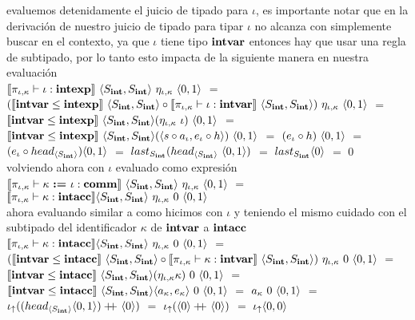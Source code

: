 evaluemos detenidamente el juicio de tipado para $\iota$, es importante notar que en
la derivaci\'on de nuestro juicio de tipado  para tipar $\iota$ no alcanza con
simplemente buscar en el contexto, ya que $\iota$ tiene tipo $\textbf{intvar}$ entonces
hay que usar una regla de subtipado, por lo tanto esto impacta de la siguiente
manera en nuestra evaluaci\'on\\

$\llbracket  \pi_{\iota,\kappa} \vdash \iota : \textbf{intexp}  \rrbracket 
	\ \langle S_{\textbf{int}},S_{\textbf{int}} \rangle
	\ \eta_{\iota,\kappa} 
	\ \langle 0,1 \rangle$ $=$ \\
	\indent
	$(\semBrcks{\intvar \leq \intexp} \ \lrangles{S_\intt,S_\intt}
	\circ 
	\semBrcks{ \pi_{\iota,\kappa} \vdash \iota : \intvar } \ \lrangles{S_\intt,S_\intt})
		\ \eta_{\iota,\kappa} 
		\ \lrangles{0,1}$ $=$\\
	\indent
	$\semBrcks{\intvar \leq \intexp} \ \lrangles{S_\intt,S_\intt} 
				(\eta_{\iota,\kappa} \ \iota) \ \lrangles{0,1}$ $=$\\
	\indent
	$\semBrcks{\intvar \leq \intexp} \ \lrangles{S_\intt,S_\intt} 
				(\lrangles{s \circ a_\iota,e_\iota \circ h}) \ \lrangles{0,1}$ $=$
	$(e_\iota \circ h) \ \langle 0,1 \rangle$ $=$\\
	\indent
	$(e_\iota \circ head_{\langle S_{\textbf{int}} \rangle}) \langle 0,1 \rangle$ $=$
	$last_{S_\intt} (head_{\lrangles{S_\intt}} \ \lrangles{0,1})$ $=$
	$last_{S_{\textbf{int}}} \langle 0 \rangle$ $=$ $0$\\
	
volviendo ahora con $\iota$ evaluado como expresi\'on\\

$\llbracket \pi_{\iota,\kappa} \vdash \kappa \ \textbf{:=} \ \iota: \textbf{comm} \rrbracket
		\ \langle S_{\textbf{int}},S_{\textbf{int}} \rangle \ \eta_{\iota,\kappa}
		\ \langle 0,1 \rangle$ $=$\\
\indent \indent \indent \indent
$\llbracket \pi_{\iota,\kappa} \vdash \kappa : \textbf{intacc} \rrbracket
	\langle S_{\textbf{int}},S_{\textbf{int}} \rangle 
	\ \eta_{\iota,\kappa}
	\ 0 \ \langle 0,1 \rangle$\\

ahora evaluando similar a como hicimos con $\iota$ y teniendo el mismo cuidado
con el subtipado del identificador $\kappa$ de $\textbf{intvar}$ a $\textbf{intacc}$\\

$\llbracket \pi_{\iota,\kappa} \vdash \kappa : \textbf{intacc} \rrbracket
	\langle S_{\textbf{int}},S_{\textbf{int}} \rangle 
	\ \eta_{\iota,\kappa}
	\ 0 \ \langle 0,1 \rangle$ $=$\\
	\indent
$(\semBrcks{\intvar \leq \intacc} \ \lrangles{S_\intt,S_\intt}
	\circ 
	\semBrcks{ \pi_{\iota,\kappa} \vdash \kappa : \intvar } \ \lrangles{S_\intt,S_\intt})
		\ \eta_{\iota,\kappa} 
		\ 0 \ \lrangles{0,1}$ $=$\\
	\indent
$\semBrcks{\intvar \leq \intacc} \ \lrangles{S_\intt,S_\intt} (\eta_{\iota,\kappa} \kappa)
		\ 0 \ \lrangles{0,1}$ $=$\\
	\indent
$\semBrcks{\intvar \leq \intacc} \ \lrangles{S_\intt,S_\intt} \lrangles{a_\kappa,e_\kappa}
		\ 0 \ \lrangles{0,1}$ $=$ $a_\kappa \ 0 \ \langle 0,1 \rangle$ $=$\\
	\indent
$\iota_{\uparrow} ((head_{\langle S_{\textbf{int}} \rangle} \langle 0,1 \rangle) +\kern-1.3ex+\kern0.8ex \langle 0 \rangle)$ $=$
$\iota_{\uparrow} (\langle 0 \rangle +\kern-1.3ex+\kern0.8ex \langle 0 \rangle)$ $=$ $\iota_{\uparrow} \langle 0,0 \rangle$\\

